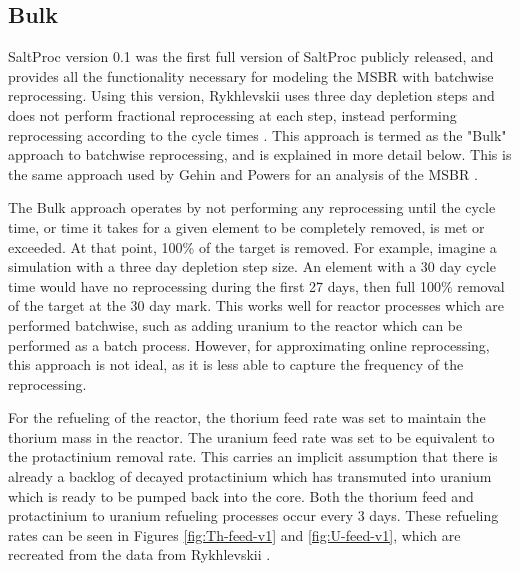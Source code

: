 \subsection{Bulk}

SaltProc version 0.1 was the first full version of SaltProc publicly released, and provides all the functionality necessary for modeling the MSBR with batchwise reprocessing.
Using this version, Rykhlevskii uses three day depletion steps and does not perform fractional reprocessing at each step, instead performing reprocessing according to the cycle times \cite{rykhlevskii_advanced_2018}.
This approach is termed as the "Bulk" approach to batchwise reprocessing, and is explained in more detail below. This is the same approach used by Gehin and Powers for an analysis of the MSBR \cite{gehin_liquid_2016}.

The Bulk approach operates by not performing any reprocessing until the cycle time, or time it takes for a given element to be completely removed, is met or exceeded.
At that point, 100\% of the target is removed.
For example, imagine a simulation with a three day depletion step size. An element with a 30 day cycle time would have no reprocessing during the first 27 days, then full 100\% removal of the target at the 30 day mark. This works well for reactor processes which are performed batchwise, such as adding uranium to the reactor which can be performed as a batch process. However, for approximating online reprocessing, this approach is not ideal, as it is less able to capture the frequency of the reprocessing.

For the refueling of the reactor, the thorium feed rate was set to maintain the thorium mass in the reactor. The uranium feed rate was set to be equivalent to the protactinium removal rate. This carries an implicit assumption that there is already a backlog of decayed protactinium which has transmuted into uranium which is ready to be pumped back into the core. Both the thorium feed and protactinium to uranium refueling processes occur every 3 days. These refueling rates can be seen in Figures \ref{fig:Th-feed-v1} and \ref{fig:U-feed-v1}, which are recreated from the data from Rykhlevskii \cite{rykhlevskii_advanced_2018}.


